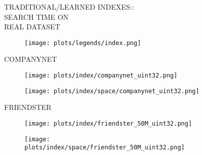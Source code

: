 \documentclass{article}
\begin{document}
\begin{figure}[!htbp]
\fbox
{
\begin{minipage}[t][0.98\textheight][t]{\textwidth}
\centering 
    \begin{minipage}{0.23\linewidth}
    \footnotesize{TRADITIONAL/LEARNED INDEXES::\\SEARCH TIME ON \\ REAL DATASET}
    \end{minipage}
   \begin{minipage}{0.7\linewidth}
        \begin{figure}[H]
        \texttt{[image: plots/legends/index.png]}
        \end{figure}
    \end{minipage}
    \vspace*{-10px}

    \begin{minipage}{0.05\linewidth}
    \begin{sideways}\small COMPANYNET\end{sideways}
    \end{minipage}
    \begin{minipage}{0.32\linewidth}
        \begin{figure}[H]
        \texttt{[image: plots/index/companynet\_uint32.png]}
        \end{figure}
    \end{minipage}
    \begin{minipage}{0.32\linewidth}
        \begin{figure}[H]
            \texttt{[image: plots/index/space/companynet\_uint32.png]}
        \end{figure}
    \end{minipage}
    \vspace*{-16px}

    \begin{minipage}{0.05\linewidth}
    \begin{sideways}\small FRIENDSTER\end{sideways}
    \end{minipage}
    \begin{minipage}{0.32\linewidth}
        \begin{figure}[H]
        \texttt{[image: plots/index/friendster\_50M\_uint32.png]}
        \end{figure}
    \end{minipage}
    \begin{minipage}{0.32\linewidth}
        \begin{figure}[H]
            \texttt{[image: plots/index/space/friendster\_50M\_uint32.png]}
        \end{figure}
    \end{minipage}
    \vspace*{-16px}


\end{minipage}}
\end{figure}
\end{document}
